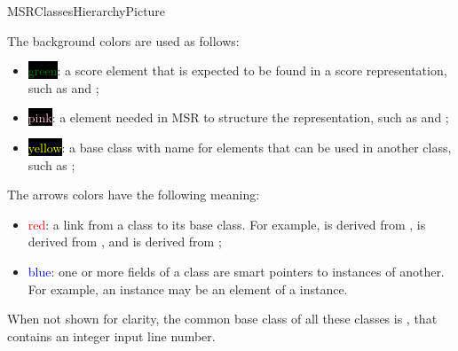 {MSRClassesHierarchyPicture}

The background colors are used as follows:
\begin{itemize}
\item \colorbox{black}{\textcolor{green}{green}}: a score element that is expected to be found in a score representation, such as  and ;

\item \colorbox{black}{\textcolor{pink}{pink}}: a element needed in MSR to structure the representation, such as  and ;

\item \colorbox{black}{\textcolor{yellow}{yellow}}: a base class   with name  for elements that can be used in another class, such as ;
\end{itemize}

The arrows colors have the following meaning:
\begin{itemize}
\item \textcolor{red}{red}: a link from a class   to its base class. For example,  is derived from ,  is derived from , and  is derived from ;

\item \textcolor{blue}{blue}: one or more fields of a class   are smart pointers to instances of another. For example, an  instance may be an element of a  instance.
\end{itemize}

When not shown for clarity, the common base class   of all these classes is , that contains an integer input line number.

